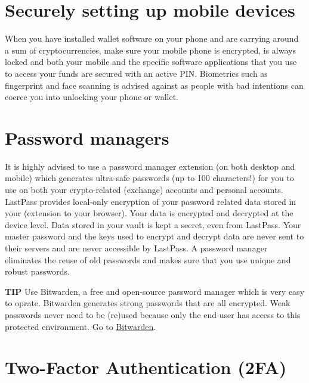 \section{Securely setting up mobile devices}
When you have installed wallet software on your phone and are carrying around a sum of cryptocurrencies, make sure your mobile phone is encrypted, is always locked and both your mobile and the specific software applications that you use to access your funds are secured with an active PIN. Biometrics such as fingerprint and face scanning is advised against as people with bad intentions can coerce you into unlocking your phone or wallet.

\section{Password managers}
It is highly advised to use a password manager extension (on both desktop and mobile) which generates ultra-safe passwords (up to 100 characters!) for you to use on both your crypto-related (exchange) accounts and personal accounts. LastPass provides local-only encryption of your password related data stored in your  (extension to your browser). Your data is encrypted and decrypted at the device level. Data stored in your vault is kept a secret, even from LastPass. Your master password and the keys used to encrypt and decrypt data are never sent to their servers and are never accessible by LastPass. A password manager eliminates the reuse of old passwords and makes sure that you use unique and robust passwords.

    \bigskip
    \begin{tipbox}{\textbf{TIP}}
        Use Bitwarden, a free and open-source password manager which is very easy to oprate. Bitwarden generates strong passwords that are all encrypted. Weak passwords never need to be (re)used because only the end-user has access to this protected environment.
        \tcblower
        Go to \href{https://bitwarden.com/}{Bitwarden}.
    \end{tipbox}

\section{Two-Factor Authentication (2FA)}
\label{sec:2FA}

